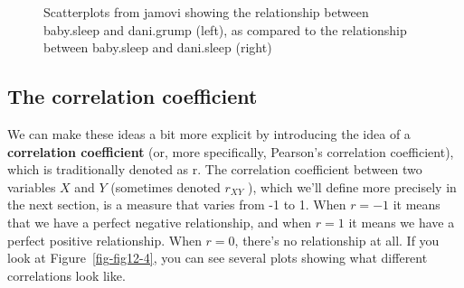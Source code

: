 \documentclass[
  a4paper,
]{book}
\begin{document}
\begin{figure}
\begin{minipage}[b]{0.50\linewidth}
{}

\subcaption{\label{fig-fig12-3b}}
\end{minipage}%

\caption{\label{fig-fig12-3}Scatterplots from jamovi showing the
relationship between baby.sleep and dani.grump (left), as compared to
the relationship between baby.sleep and dani.sleep (right)}

\end{figure}

\hypertarget{the-correlation-coefficient}{%
\subsection{The correlation
coefficient}\label{the-correlation-coefficient}}

We can make these ideas a bit more explicit by introducing the idea of a
\textbf{correlation coefficient} (or, more specifically, Pearson's
correlation coefficient), which is traditionally denoted as r. The
correlation coefficient between two variables \(X\) and \(Y\) (sometimes
denoted \(r_{XY}\) ), which we'll define more precisely in the next
section, is a measure that varies from -1 to 1. When \(r = -1\) it means
that we have a perfect negative relationship, and when \(r = 1\) it
means we have a perfect positive relationship. When \(r = 0\), there's
no relationship at all. If you look at Figure~\ref{fig-fig12-4}, you can
see several plots showing what different correlations look like.
\end{document}
